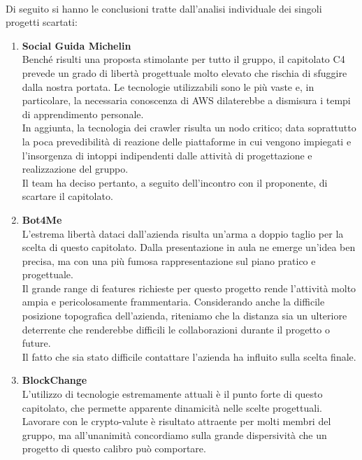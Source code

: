 \paragraph{}
Di seguito si hanno le conclusioni tratte dall'analisi individuale dei singoli progetti scartati:
\begin{enumerate}
    \item \textbf{Social Guida Michelin} \\
      Benché risulti una proposta stimolante per tutto il gruppo, il capitolato C4 prevede un grado di libertà
      progettuale molto elevato che rischia di sfuggire dalla nostra portata. Le tecnologie utilizzabili sono
      le più vaste e, in particolare, la necessaria conoscenza di AWS dilaterebbe a dismisura i tempi di
      apprendimento personale.\\
      In aggiunta, la tecnologia dei crawler risulta un nodo critico;  data soprattutto la poca prevedibilità
      di reazione delle piattaforme in cui vengono impiegati e l'insorgenza di intoppi indipendenti dalle attività
      di progettazione e realizzazione del gruppo.\\
      Il team ha deciso pertanto, a seguito dell'incontro con il proponente, di scartare il capitolato.
    \item \textbf{Bot4Me} \\ 
      L'estrema libertà dataci dall'azienda risulta un'arma a doppio taglio per la scelta di questo capitolato.
      Dalla presentazione in aula ne emerge un'idea ben precisa, ma con una più fumosa rappresentazione sul piano
      pratico e progettuale.\\ Il grande range di features richieste per questo progetto rende l'attività molto
      ampia e pericolosamente frammentaria. Considerando anche la difficile posizione topografica dell'azienda,
      riteniamo che la distanza sia un ulteriore deterrente che renderebbe difficili le collaborazioni durante
      il progetto o future.\\ Il fatto che sia stato difficile contattare l'azienda ha influito sulla scelta finale.
    \item \textbf{BlockChange} \\ 
      L'utilizzo di tecnologie estremamente attuali è il punto forte di questo capitolato, che permette apparente
      dinamicità nelle scelte progettuali. Lavorare con le crypto-valute è risultato attraente per molti membri
      del gruppo, ma all'unanimità concordiamo sulla grande dispersività che un progetto di questo calibro può
      comportare. \\

\end{enumerate}
